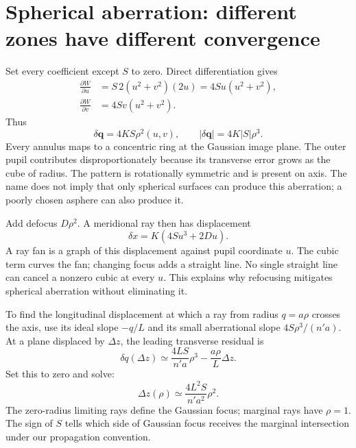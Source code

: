 \section{Spherical aberration: different zones have different convergence}
Set every coefficient except $S$ to zero. Direct differentiation gives
\begin{align}
 \frac{\partial W}{\partial u}
 &=S\,2(u^2+v^2)(2u)=4Su(u^2+v^2),\\
 \frac{\partial W}{\partial v}
 &=4Sv(u^2+v^2).
\end{align}
Thus
\begin{equation}
 \delta\bm q=4KS\rho^2(u,v),\qquad
 |\delta\bm q|=4K|S|\rho^3.
 \label{ab:sphericalrays}
\end{equation}
Every annulus maps to a concentric ring at the Gaussian image plane. The
outer pupil contributes disproportionately because its transverse error grows
as the cube of radius. The pattern is rotationally symmetric and is present
on axis. The name does not imply that only spherical surfaces can produce
this aberration; a poorly chosen asphere can also produce it.

Add defocus $D\rho^2$. A meridional ray then has displacement
\begin{equation}
 \delta x=K(4Su^3+2Du).
 \label{ab:sphericalfan}
\end{equation}
A ray fan is a graph of this displacement against pupil coordinate $u$.
The cubic term curves the fan; changing focus adds a straight line. No single
straight line can cancel a nonzero cubic at every $u$. This explains why
refocusing mitigates spherical aberration without eliminating it.

To find the longitudinal displacement at which a ray from radius $q=a\rho$
crosses the axis, use its ideal slope $-q/L$ and its small aberrational slope
$4S\rho^3/(n'a)$. At a plane displaced by $\Delta z$, the leading transverse
residual is
\begin{equation}
 \delta q(\Delta z)\simeq
       \frac{4LS}{n'a}\rho^3-\frac{a\rho}{L}\Delta z.
\end{equation}
Set this to zero and solve:
\begin{equation}
 \Delta z(\rho)\simeq\frac{4L^2S}{n'a^2}\rho^2.
 \label{ab:LSA}
\end{equation}
The zero-radius limiting rays define the Gaussian focus; marginal rays have
$\rho=1$. The sign of $S$ tells which side of Gaussian focus receives the
marginal intersection under our propagation convention.

